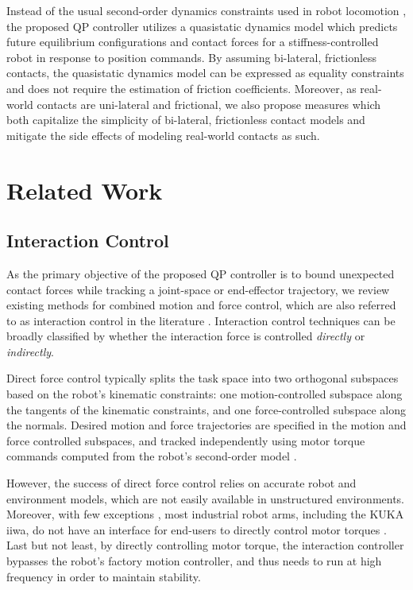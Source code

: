 Instead of the usual second-order dynamics constraints used in robot locomotion \cite{kuindersma2014efficiently, koolen2016design}, the proposed QP controller utilizes a quasistatic dynamics model which predicts future equilibrium configurations and contact forces for a stiffness-controlled robot in response to position commands. By assuming bi-lateral, frictionless contacts, the quasistatic dynamics model can be expressed as equality constraints and does not require the estimation of friction coefficients. Moreover, as real-world contacts are uni-lateral and frictional, we also propose measures which both capitalize the simplicity of bi-lateral, frictionless contact models and mitigate the side effects of modeling real-world contacts as such.


\section{Related Work  \label{sec:related_work}}
\subsection{Interaction Control}
As the primary objective of the proposed QP controller is to bound unexpected contact forces while tracking a joint-space or end-effector trajectory, we review existing methods for combined motion and force control, which are also referred to as interaction control in the literature \cite[Chapter~9]{siciliano2008springer}. Interaction control techniques can be broadly classified by whether the interaction force is controlled \textit{directly} or \textit{indirectly}. 

Direct force control typically splits the task space into two orthogonal subspaces based on the robot's kinematic constraints: one motion-controlled subspace along the tangents of the kinematic constraints, and one force-controlled subspace along the normals. Desired motion and force trajectories are specified in the motion and force controlled subspaces, and tracked independently using motor torque commands computed from the robot's second-order model \cite{mason1981compliance, khatib1987unified, raibert1981hybrid}. 

However, the success of direct force control relies on accurate robot and environment models, which are not easily available in unstructured environments. Moreover, with few exceptions \cite{franka}, most industrial robot arms, including the KUKA iiwa, do not have an interface for end-users to directly control motor torques \cite{kuka2019fri}. Last but not least, by directly controlling motor torque, the interaction controller bypasses the robot's factory motion controller, and thus needs to run at high frequency in order to maintain stability.

